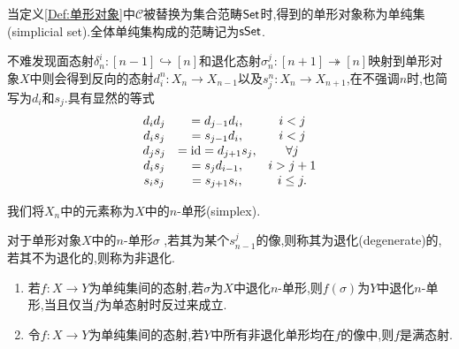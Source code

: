 \begin{definition}[单纯集]
    当定义\ref{Def:单形对象}中$\mathcal{C}$被替换为集合范畴$\mathsf{Set}$时,得到的单形对象称为单纯集(simplicial set).全体单纯集构成的范畴记为$\mathsf{sSet}$.
\end{definition}
\begin{remark}[面态射与退化态射]\label{注记:面态射与退化态射}
    不难发现面态射$\delta_n^i:[n-1]\hookrightarrow [n]$和退化态射$\sigma_n^j:[n+1]\twoheadrightarrow [n]$映射到单形对象$X$中则会得到反向的态射$d_i^n : X_n \to X_{n-1}$以及$s_j^n: X_n \to X_{n+1}$,在不强调$n$时,也简写为$d_i$和$s_j$.具有显然的等式
    \begin{equation}\label{公式:态射关系}
        \begin{array}{ccc}
        d_id_j &= d_{j-1} d_i, & i<j\\
        d_is_j &= s_{j-1} d_i, & i<j\\
        d_js_j &= \mathrm{id} = d_{j+1}s_j, &\forall j\\
        d_is_j &= s_jd_{i-1}, & i>j+1\\
        s_is_j &= s_{j+1}s_i, & i\leq j.
        \end{array}
    \end{equation}
    
\end{remark}
我们将$X_n$中的元素称为$X$中的$n$-单形(simplex).
\begin{definition}[退化单形]
    对于单形对象$X$中的$n$-单形$\sigma$ ,若其为某个$s_{n-1}^j$的像,则称其为退化(degenerate)的,若其不为退化的,则称为非退化.
\end{definition}
\begin{remark}\label{Rk:退化单形}
    \begin{enumerate}
        \item 若$f : X \to Y$为单纯集间的态射,若$\sigma$为$X$中退化$n$-单形,则$f(\sigma)$为$Y$中退化$n$-单形,当且仅当$f$为单态射时反过来成立.
        \item 令$f : X \to Y$为单纯集间的态射,若$Y$中所有非退化单形均在$f$的像中,则$f$是满态射.
    \end{enumerate}
\end{remark}

